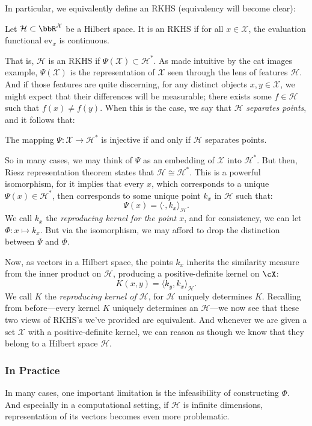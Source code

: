 \documentclass[twoside,11pt]{homework}
\begin{document}
In particular, we equivalently define an RKHS (equivalency will become clear):
\begin{definition}
Let $\mathcal{H} \subset \bbR^{\mathcal{X}}$ be a Hilbert space. It is an RKHS if for all $x \in \mathcal{X}$, the evaluation functional $\mathrm{ev}_x$ is continuous.
\end{definition}
That is, $\mathcal{H}$ is an RKHS if $\Psi(\mathcal{X}) \subset \mathcal{H}^*$. As made intuitive by the cat images example, $\Psi(\mathcal{X})$ is the representation of $\mathcal{X}$ seen through the lens of features $\mathcal{H}$. And if those features are quite discerning, for any distinct objects $x,y \in \mathcal{X}$, we might expect that their differences will be measurable; there exists some $f \in \mathcal{H}$ such that $f(x) \ne f(y)$. When this is the case, we say that $\mathcal{H}$ \emph{separates points}, and it follows that:
\begin{proposition}
  The mapping $\Psi : \mathcal{X} \to \mathcal{H}^*$ is injective if and only if $\mathcal{H}$ separates points.
\end{proposition}

So in many cases, we may think of $\Psi$ as an embedding of $\mathcal{X}$ into $\mathcal{H}^*$. But then, Riesz representation theorem states that $\mathcal{H} \cong \mathcal{H}^*$. This is a powerful isomorphism, for it implies that every $x$, which corresponds to a unique $\Psi(x) \in \mathcal{H}^*$, then corresponds to some unique point $k_x$ in $\mathcal{H}$ such that:
\[\Psi(x) = \langle \cdot, k_x\rangle_\mathcal{H}.\]
We call $k_x$ the \emph{reproducing kernel for the point $x$}, and for consistency, we can let $\Phi: x \mapsto k_x$. But via the isomorphism, we may afford to drop the distinction between $\Psi$ and $\Phi$.

Now, as vectors in a Hilbert space, the points $k_x$ inherits the similarity measure from the inner product on $\mathcal{H}$, producing a positive-definite kernel on $\cX$:
\[K(x,y) = \langle k_y, k_x\rangle_\mathcal{H}.\]
We call $K$ the \emph{reproducing kernel of $\mathcal{H}$}, for $\mathcal{H}$ uniquely determines $K$. Recalling from before---every kernel $K$ uniquely determines an $\mathcal{H}$---we now see that these two views of RKHS's we've provided are equivalent. And whenever we are given a set $\mathcal{X}$ with a positive-definite kernel, we can reason as though we know that they belong to a Hilbert space $\mathcal{H}$.

\subsubsection{In Practice}
In many cases, one important limitation is the infeasibility of constructing $\Phi$. And especially in a computational setting, if $\mathcal{H}$ is infinite dimensions, representation of its vectors becomes even more problematic.
\end{document}
